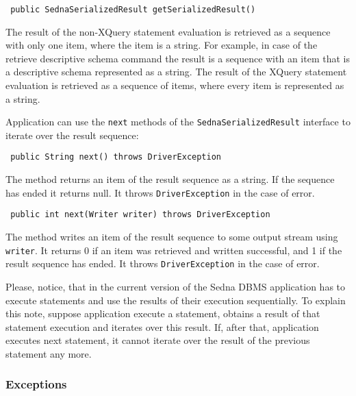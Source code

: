 \documentclass[a4paper,12pt]{article}
\begin{document}
\begin{verbatim}
 public SednaSerializedResult getSerializedResult()
\end{verbatim}

The result of the non-XQuery statement evaluation is retrieved as a sequence
with only one item, where the item is a string. For example, in case of the
retrieve descriptive schema command the result is a sequence with an item that
is a descriptive schema represented as a string. The result of the XQuery
statement evaluation is retrieved as a sequence of items, where every item is
represented as a string.

Application can use the \verb!next! methods of the \verb!SednaSerializedResult!
interface to iterate over the result sequence:

\begin{verbatim}
 public String next() throws DriverException
\end{verbatim}

The method returns an item of the result sequence as a string. If the sequence
has ended it returns null. It throws \verb!DriverException! in the case of
error.

\begin{verbatim}
 public int next(Writer writer) throws DriverException
\end{verbatim}

The method writes an item of the result sequence to some output stream using
\verb!writer!. It returns 0 if an item was retrieved and written successful, and
1 if the result sequence has ended. It throws \verb!DriverException! in the case
of error.

Please, notice, that in the current version of the Sedna DBMS application has to
execute statements and use the results of their execution sequentially. To
explain this note, suppose application execute a statement, obtains a result of
that statement execution and iterates over this result. If, after that,
application executes next statement, it cannot iterate over the result of the
previous statement any more.


\subsubsection{Exceptions}
\end{document}

